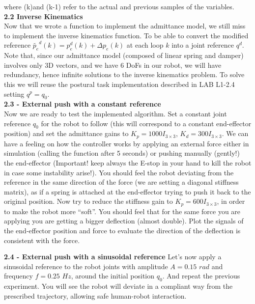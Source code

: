 \documentclass[11pt]{article}
\begin{document}
where (k)and (k-1) refer to the actual and previous samples of the variables. \\

\textbf{2.2 Inverse Kinematics}\\
Now that we wrote a function to implement the admittance model, we still miss to implement the inverse kinematics function. To be able to convert the modified reference $\tilde{p_e}^d(k) = p_e^d(k) +  \Delta p_e(k)$  at each loop $k$ into a joint reference $q^d$. Note that, since our admittance model (composed of linear spring and damper)  involves only 3D vectors, and we have 6 DoFs in our robot, we will have redundancy, hence  infinite solutions to the inverse kinematics problem. To solve this we will reuse the postural task implementation described in LAB L1-2.4 setting  $q^p = q_0$.\\


\textbf{2.3 - External push with a constant reference}\\
Now we are ready to test the implemented algorithm. Set  a constant joint reference $q_0$  for the robot to follow (this will correspond to a constant end-effector position) and set the admittance gains to $K_p = 1000I_{3\times3}$,  $K_d = 300I_{3\times3}$. We can have a feeling  on how the controller works by applying an external force either in simulation (calling the function  after 5 seconds) or pushing manually (gently!) the end-effector (Important! keep always the E-stop in your hand to kill the robot in case some instability arise!). You should feel the robot deviating from the reference in the same direction of the force (we are setting a diagonal stiffness matrix), as if a spring is attached at the end-effector trying to push it back to the original position. 
Now try to reduce the stiffness gain to $K_p = 600I_{3\times3}$, in order to make the robot more ``soft''. You should feel that for the same force you are applying you are getting a bigger deflection (almost double).
Plot the signals of the end-effector position and force to evaluate the direction of the deflection is consistent with the force.

\textbf{2.4 - External push with a sinusoidal reference}
Let's now apply a sinusoidal reference to the robot joints  with amplitude $A= 0.15$ $rad$ and frequency $f = 0.25$ $Hz$, around the initial position $q_0$.
And repeat the previous experiment. You will see the robot will deviate in a compliant way from the prescribed trajectory, allowing safe human-robot interaction.\\
\end{document}
